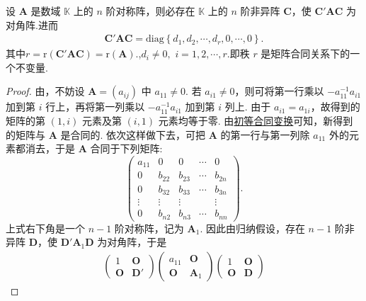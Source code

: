 \documentclass[../../main.tex]{subfiles}%
\begin{document}
\begin{theorem}[对称矩阵的合同标准型]\label{theorem:对称矩阵的合同标准型}
设 $\boldsymbol{A}$ 是数域 $\mathbb{K}$ 上的 $n$ 阶对称阵，则必存在 $\mathbb{K}$ 上的 $n$ 阶非异阵 $\boldsymbol{C}$，使 $\boldsymbol{C}'\boldsymbol{A}\boldsymbol{C}$ 为对角阵.进而
\begin{align*}
\boldsymbol{C}' \boldsymbol{AC}=\mathrm{diag}\left\{ d_1,d_2,\cdots ,d_r,0,\cdots ,0 \right\} .
\end{align*}
其中$r=\mathrm{r}\left( \boldsymbol{C}' \boldsymbol{AC} \right)=\mathrm{r}\left( \boldsymbol{A} \right) .$,$d_i\ne 0,$ $i=1,2,\cdots,r.$即秩 $r$ 是矩阵合同关系下的一个不变量.
\end{theorem}
\begin{proof}
由，不妨设 $\boldsymbol{A}=(a_{ij})$ 中 $a_{11}\neq 0$. 若 $a_{i1}\neq 0$，则可将第一行乘以 $-a_{11}^{-1}a_{i1}$ 加到第 $i$ 行上，再将第一列乘以 $-a_{11}^{-1}a_{i1}$ 加到第 $i$ 列上. 由于 $a_{i1}=a_{1i}$，故得到的矩阵的第 $(1,i)$ 元素及第 $(i,1)$ 元素均等于零. 由\hyperref[lemma:初等合同变换]{初等合同变换}可知，新得到的矩阵与 $\boldsymbol{A}$ 是合同的. 依次这样做下去，可把 $\boldsymbol{A}$ 的第一行与第一列除 $a_{11}$ 外的元素都消去，于是 $\boldsymbol{A}$ 合同于下列矩阵:
\[
\begin{pmatrix}
a_{11} & 0 & 0 & \cdots & 0 \\
0 & b_{22} & b_{23} & \cdots & b_{2n} \\
0 & b_{32} & b_{33} & \cdots & b_{3n} \\
\vdots & \vdots & \vdots & & \vdots \\
0 & b_{n2} & b_{n3} & \cdots & b_{nn}
\end{pmatrix}.
\]
上式右下角是一个 $n - 1$ 阶对称阵，记为 $\boldsymbol{A}_1$. 因此由归纳假设，存在 $n - 1$ 阶非异阵 $\boldsymbol{D}$，使 $\boldsymbol{D}'\boldsymbol{A}_1\boldsymbol{D}$ 为对角阵，于是
\begin{align*}
\begin{pmatrix}
1 & \boldsymbol{O} \\
\boldsymbol{O} & \boldsymbol{D}'
\end{pmatrix}
\begin{pmatrix}
a_{11} & \boldsymbol{O} \\
\boldsymbol{O} & \boldsymbol{A}_1
\end{pmatrix}
\begin{pmatrix}
1 & \boldsymbol{O} \\
\boldsymbol{O} & \boldsymbol{D}
\end{pmatrix}

\end{align*}
\end{proof}
\end{document}
